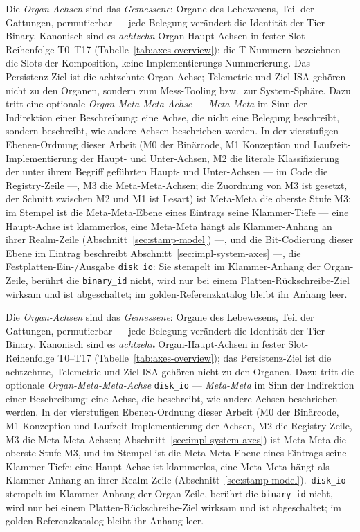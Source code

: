 \begin{nurlang}
Die \emph{Organ-Achsen} sind das \emph{Gemessene}: Organe des Lebewesens, Teil der Gattungen,
permutierbar --- jede Belegung verändert die Identität der Tier-Binary. Kanonisch sind es
\emph{achtzehn} Organ-Haupt-Achsen in fester Slot-Reihenfolge T0--T17
(Tabelle~\ref{tab:axes-overview}); die T-Nummern bezeichnen die Slots der Komposition, keine
Implementierungs-Nummerierung. Das Persistenz-Ziel ist die achtzehnte Organ-Achse; Telemetrie und
Ziel-ISA gehören nicht zu den Organen, sondern zum Mess-Tooling bzw.\ zur System-Sphäre. Dazu tritt
eine optionale \emph{Organ-Meta-Meta-Achse} --- \emph{Meta-Meta} im Sinn der Indirektion einer
Beschreibung: eine Achse, die nicht eine Belegung beschreibt, sondern beschreibt, wie andere Achsen
beschrieben werden. In der vierstufigen Ebenen-Ordnung dieser Arbeit (M0 der Binärcode, M1 Konzeption
und Laufzeit-Implementierung der Haupt- und Unter-Achsen, M2 die literale Klassifizierung der unter
ihrem Begriff geführten Haupt- und Unter-Achsen --- im Code die Registry-Zeile ---, M3 die
Meta-Meta-Achsen; die Zuordnung von M3 ist gesetzt, der Schnitt zwischen M2 und M1 ist Lesart) ist
Meta-Meta die oberste Stufe M3; im Stempel ist die Meta-Meta-Ebene eines Eintrags seine Klammer-Tiefe --- eine Haupt-Achse
ist klammerlos, eine Meta-Meta hängt als Klammer-Anhang an ihrer Realm-Zeile
(Abschnitt~\ref{sec:stamp-model}) ---, und die Bit-Codierung dieser Ebene im Eintrag beschreibt
Abschnitt~\ref{sec:impl-system-axes} ---, die Festplatten-Ein-/Ausgabe \texttt{disk\_io}: Sie stempelt im Klammer-Anhang der Organ-Zeile,
berührt die \texttt{binary\_id} nicht, wird nur bei einem Platten-Rückschreibe-Ziel wirksam und ist
abgeschaltet; im golden-Referenzkatalog bleibt ihr Anhang leer.
\end{nurlang}
\begin{nurkurz}
Die \emph{Organ-Achsen} sind das \emph{Gemessene}: Organe des Lebewesens, Teil der Gattungen, permutierbar ---
jede Belegung verändert die Identität der Tier-Binary. Kanonisch sind es \emph{achtzehn} Organ-Haupt-Achsen in
fester Slot-Reihenfolge T0--T17 (Tabelle~\ref{tab:axes-overview}); das Persistenz-Ziel ist die achtzehnte,
Telemetrie und Ziel-ISA gehören nicht zu den Organen. Dazu tritt die optionale \emph{Organ-Meta-Meta-Achse}
\texttt{disk\_io} --- \emph{Meta-Meta} im Sinn der Indirektion einer Beschreibung: eine Achse, die beschreibt,
wie andere Achsen beschrieben werden. In der vierstufigen Ebenen-Ordnung dieser Arbeit (M0 der Binärcode, M1
Konzeption und Laufzeit-Implementierung der Achsen, M2 die Registry-Zeile, M3 die Meta-Meta-Achsen;
Abschnitt~\ref{sec:impl-system-axes}) ist Meta-Meta die oberste Stufe M3, und im Stempel ist die
Meta-Meta-Ebene eines Eintrags seine Klammer-Tiefe: eine Haupt-Achse ist klammerlos, eine Meta-Meta hängt als
Klammer-Anhang an ihrer Realm-Zeile (Abschnitt~\ref{sec:stamp-model}).\ \texttt{disk\_io} stempelt im
Klammer-Anhang der Organ-Zeile, berührt die \texttt{binary\_id} nicht, wird nur bei einem
Platten-Rückschreibe-Ziel wirksam und ist abgeschaltet; im golden-Referenzkatalog bleibt ihr Anhang leer.
\end{nurkurz}

